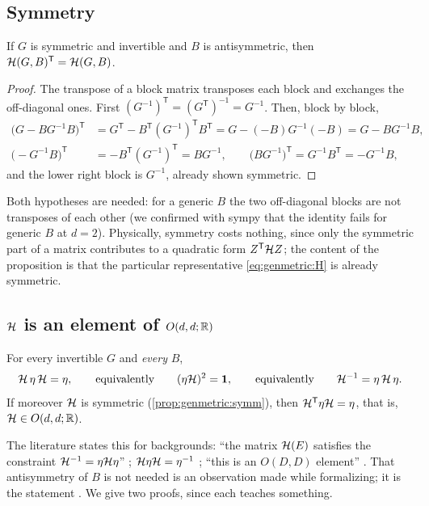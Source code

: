\subsection{Symmetry}

\begin{proposition}\label{prop:genmetric:symm}
If $G$ is symmetric and invertible and $B$ is antisymmetric, then
$\mathcal{H}(G,B)^{\mathsf T}=\mathcal{H}(G,B)$.
\end{proposition}
\begin{proof}
The transpose of a block matrix transposes each block and exchanges the off-diagonal
ones. First $(G^{-1})^{\mathsf T}=(G^{\mathsf T})^{-1}=G^{-1}$. Then, block by block,
\begin{align*}
 \big(G-BG^{-1}B\big)^{\mathsf T}&=G^{\mathsf T}-B^{\mathsf T}(G^{-1})^{\mathsf T}B^{\mathsf T}
 =G-(-B)G^{-1}(-B)=G-BG^{-1}B,\\
 \big(-G^{-1}B\big)^{\mathsf T}&=-B^{\mathsf T}(G^{-1})^{\mathsf T}=BG^{-1},\qquad
 \big(BG^{-1}\big)^{\mathsf T}=G^{-1}B^{\mathsf T}=-G^{-1}B,
\end{align*}
and the lower right block is $G^{-1}$, already shown symmetric.
\end{proof}
\noindent Both hypotheses are needed: for a generic $B$ the two off-diagonal blocks are
not transposes of each other (we confirmed with sympy that the identity fails for generic
$B$ at $d=2$). Physically, symmetry costs nothing, since only the symmetric part of a
matrix contributes to a quadratic form $Z^{\mathsf T}\mathcal{H} Z$; the content of the proposition
is that the particular representative \eqref{eq:genmetric:H} is already symmetric.

\subsection{\texorpdfstring{$\mathcal{H}$}{H} is an element of \texorpdfstring{$O(d,d;\mathbb{R})$}{O(d,d;R)}}

\begin{theorem}\label{thm:genmetric:odd}
For every invertible $G$ and \emph{every} $B$,
\begin{equation}\label{eq:genmetric:constraint}
 \mathcal{H}\,\eta\,\mathcal{H}=\eta,\qquad\text{equivalently}\qquad(\eta\mathcal{H})^2=\mathbf 1,
 \qquad\text{equivalently}\qquad \mathcal{H}^{-1}=\eta\,\mathcal{H}\,\eta .
\end{equation}
If moreover $\mathcal{H}$ is symmetric (\cref{prop:genmetric:symm}), then
$\mathcal{H}^{\mathsf T}\eta\mathcal{H}=\eta$, that is, $\mathcal{H}\in O(d,d;\mathbb{R})$.
\end{theorem}
\noindent The literature states this for backgrounds: ``the matrix $\mathcal{H}(E)$ satisfies the
constraint $\mathcal{H}^{-1}=\eta\mathcal{H}\eta$'' ; $\mathcal{H}\eta\mathcal{H}=\eta^{-1}$
; ``this is an $O(D,D)$ element''
. That antisymmetry of $B$ is not needed is an
observation made while formalizing; it is the statement . We give
two proofs, since each teaches something.

